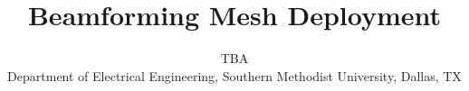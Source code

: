 \documentclass[10pt,conference]{IEEEtran}
\begin{document}
\title{Beamforming Mesh Deployment}
\author{ TBA\\ 
Department of Electrical Engineering, Southern Methodist University, Dallas, TX \\
}





\maketitle

%

%

%





\end{document}
